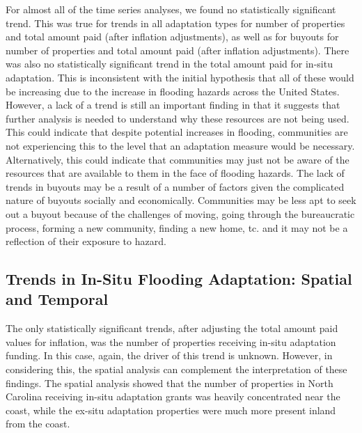 \documentclass[
  12pt,
]{article}
\begin{document}
For almost all of the time series analyses, we found no statistically
significant trend. This was true for trends in all adaptation types for
number of properties and total amount paid (after inflation
adjustments), as well as for buyouts for number of properties and total
amount paid (after inflation adjustments). There was also no
statistically significant trend in the total amount paid for in-situ
adaptation. This is inconsistent with the initial hypothesis that all of
these would be increasing due to the increase in flooding hazards across
the United States. However, a lack of a trend is still an important
finding in that it suggests that further analysis is needed to
understand why these resources are not being used. This could indicate
that despite potential increases in flooding, communities are not
experiencing this to the level that an adaptation measure would be
necessary. Alternatively, this could indicate that communities may just
not be aware of the resources that are available to them in the face of
flooding hazards. The lack of trends in buyouts may be a result of a
number of factors given the complicated nature of buyouts socially and
economically. Communities may be less apt to seek out a buyout because
of the challenges of moving, going through the bureaucratic process,
forming a new community, finding a new home, tc. and it may not be a
reflection of their exposure to hazard.

\hypertarget{trends-in-in-situ-flooding-adaptation-spatial-and-temporal}{%
\subsection{Trends in In-Situ Flooding Adaptation: Spatial and
Temporal}\label{trends-in-in-situ-flooding-adaptation-spatial-and-temporal}}

The only statistically significant trends, after adjusting the total
amount paid values for inflation, was the number of properties receiving
in-situ adaptation funding. In this case, again, the driver of this
trend is unknown. However, in considering this, the spatial analysis can
complement the interpretation of these findings. The spatial analysis
showed that the number of properties in North Carolina receiving in-situ
adaptation grants was heavily concentrated near the coast, while the
ex-situ adaptation properties were much more present inland from the
coast.
\end{document}
